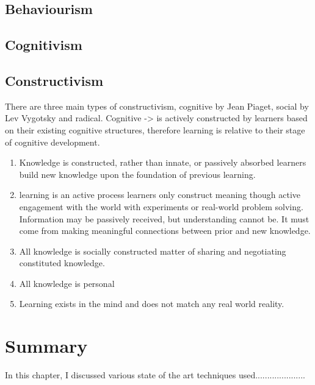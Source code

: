 \subsection{Behaviourism}



\subsection{Cognitivism}

\subsection{Constructivism}

There are three main types of constructivism, cognitive by Jean Piaget, social
by Lev Vygotsky and radical.
Cognitive -> is actively constructed by learners based on their existing cognitive
structures, therefore learning is relative to their stage of cognitive development.

\begin{enumerate}
\item Knowledge is constructed, rather than innate, or passively absorbed 
    learners build new knowledge upon the foundation of previous learning.
\item learning is an active process
    learners only construct meaning though active engagement with the world with
    experiments or real-world problem solving.
    Information may be passively received, but understanding cannot be.
    It must come from making meaningful connections between prior and new knowledge.
\item All knowledge is socially constructed
    matter of sharing and negotiating constituted knowledge.
\item All knowledge is personal
\item Learning exists in the mind and does not match any real world reality.

\end{enumerate}



\section{Summary}

In this chapter, I discussed various state of the art techniques used.....................
